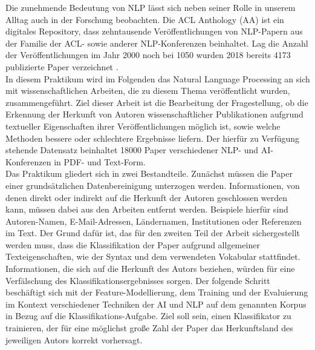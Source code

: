 \documentclass[bachelor,german]{info1thesis}
\begin{document}
Die zunehmende Bedeutung von NLP lässt sich neben seiner Rolle in unserem Alltag auch in der Forschung beobachten. Die ACL Anthology (AA) ist ein digitales Repository, dass zehntausende Veröffentlichungen von NLP-Papern aus der Familie der ACL- sowie anderer NLP-Konferenzen beinhaltet. Lag die Anzahl der Veröffentlichungen im Jahr 2000 noch bei 1050 wurden 2018 bereits 4173 publizierte Paper verzeichnet \cite{Mohammad2019}. \\
In diesem Praktikum wird im Folgenden das Natural Language Processing an sich mit wissenschaftlichen Arbeiten, die zu diesem Thema veröffentlicht wurden, zusammengeführt.
Ziel dieser Arbeit ist die Bearbeitung der Fragestellung, ob die Erkennung der Herkunft von Autoren wissenschaftlicher Publikationen aufgrund textueller Eigenschaften ihrer Veröffentlichungen möglich ist, sowie welche Methoden bessere oder schlechtere Ergebnisse liefern. Der hierfür zu Verfügung stehende Datensatz beinhaltet 18000 Paper verschiedener NLP- und AI-Konferenzen in PDF- und Text-Form. \\
Das Praktikum gliedert sich in zwei Bestandteile. Zunächst müssen die Paper einer grundsätzlichen Datenbereinigung unterzogen werden. Informationen, von denen direkt oder indirekt auf die Herkunft der Autoren geschlossen werden kann, müssen dabei aus den Arbeiten entfernt werden. Beispiele hierfür sind Autoren-Namen, E-Mail-Adressen, Ländernamen, Institutionen oder Referenzen im Text. Der Grund dafür ist, das für den zweiten Teil der Arbeit sichergestellt werden muss, dass die Klassifikation der Paper aufgrund allgemeiner Texteigenschaften, wie der Syntax und dem verwendeten Vokabular stattfindet. \\
Informationen, die sich auf die Herkunft des Autors beziehen, würden für eine Verfälschung des Klassifikationsergebnisses sorgen.
Der folgende Schritt beschäftigt sich mit der Feature-Modellierung, dem Training und der Evaluierung im Kontext verschiedener Techniken der AI und NLP auf dem genannten Korpus in Bezug auf die Klassifikations-Aufgabe. Ziel soll sein, einen Klassifikator zu trainieren, der für eine möglichst große Zahl der Paper das Herkunftsland des jeweiligen Autors korrekt vorhersagt. 




\end{document}
